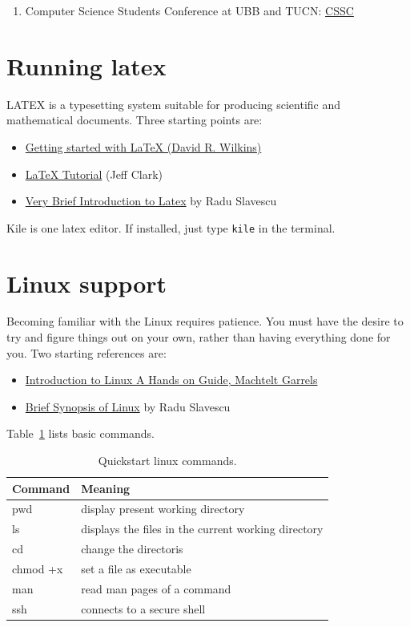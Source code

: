 \documentclass[a4paper,12pt]{report}
\begin{document}
\begin{enumerate}
 \item Computer Science Students Conference at UBB and TUCN: 
 \href{http://cs.utcluj.ro/csd/site/index.html}{CSSC}
\end{enumerate}


\section{Running latex}
LATEX is a typesetting system suitable for producing scientific and mathematical documents. 
Three starting points are: 
\begin{itemize}
 \item \href{www.maths.tcd.ie/~dwilkins/LaTeXPrimer/}{Getting started with LaTeX (David R. Wilkins)} 
\item \href{frodo.elon.edu/tutorial/tutorial/tutorial.html}{LaTeX Tutorial} (Jeff Clark)
\item \href{http://cs-gw.utcluj.ro/~srazvan/articleSchema.tgz}{Very Brief Introduction to Latex} by Radu Slavescu
\end{itemize}


Kile is one latex editor. 
If installed, just type \texttt{kile} in the terminal. 


\section{Linux support}

Becoming familiar with the Linux requires patience. 
You must have the desire to try and figure things out on your own, rather than having everything done for you. 
Two starting references are:
\begin{itemize}
 \item \href{http://tldp.org/LDP/intro-linux/html/index.html}{Introduction to Linux A Hands on Guide, Machtelt Garrels} 
 \item \href{http://cs-gw.utcluj.ro/~srazvan/articleSchema.tgz}{Brief Synopsis of Linux} by Radu Slavescu
\end{itemize}

Table~\ref{tab:commands} lists basic commands.


\begin{table}
\caption{Quickstart linux commands.}
\label{tab:commands}
\begin{center}
\begin{tabular}{|l|l|}\hline
Command & Meaning \\ \hline
pwd & display present working directory \\ \hline
ls & displays the files in the current working directory\\ \hline
cd & change the directoris \\ \hline
chmod +x & set a file as executable \\ \hline
man & read man pages of a command\\ \hline
ssh & connects to a secure shell\\ \hline
\end{tabular}
\end{center}
\end{table}
\end{document}
